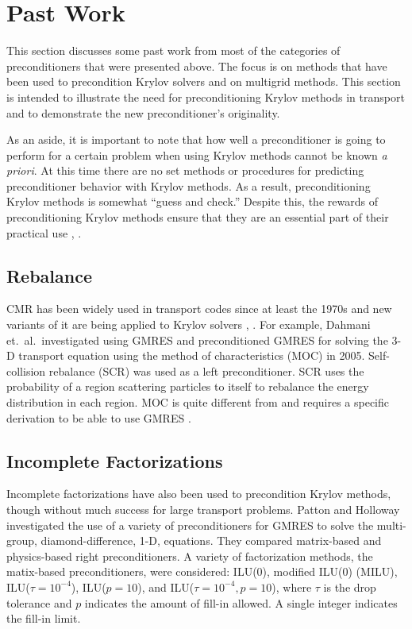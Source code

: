 \section{Past Work}
This section discusses some past work from most of the categories of preconditioners that were presented above. The focus is on methods that have been used to precondition Krylov solvers and on multigrid methods. This section is intended to illustrate the need for preconditioning Krylov methods in transport and to demonstrate the new preconditioner's originality. 

As an aside, it is important to note that how well a preconditioner is going to perform for a certain problem when using Krylov methods cannot be known \emph{a priori}. At this time there are no set methods or procedures for predicting preconditioner behavior with Krylov methods. As a result, preconditioning Krylov methods is somewhat ``guess and check.'' Despite this, the rewards of preconditioning Krylov methods ensure that they are an essential part of their practical use \cite{Knoll2004}, \cite{Benzi2002}. 

\subsection{Rebalance}
CMR has been widely used in transport codes since at least the 1970s and new variants of it are being applied to Krylov solvers \cite{Dahmani2002}, \cite{Yamamoto2005}. For example, Dahmani et.\ al.\ investigated using GMRES and preconditioned GMRES for solving the 3-D transport equation using the method of characteristics (MOC) in 2005. Self-collision rebalance (SCR) was used as a left preconditioner. SCR uses the probability of a region scattering particles to itself to rebalance the energy distribution in each region. MOC is quite different from \Sn and requires a specific derivation to be able to use GMRES \cite{Dahmani2002}. 

\subsection{Incomplete Factorizations}
Incomplete factorizations have also been used to precondition Krylov methods, though without much success for large transport problems. Patton and Holloway investigated the use of a variety of preconditioners for GMRES to solve the multi-group, diamond-difference, 1-D, \Sn equations. They compared matrix-based and physics-based right preconditioners. A variety of factorization methods, the matix-based preconditioners, were considered: ILU(0), modified ILU(0) (MILU), ILU($\tau=10^{-4}$), ILU($p=10$), and ILU($\tau=10^{-4}, p=10$), where $\tau$ is the drop tolerance and $p$ indicates the amount of fill-in allowed. A single integer indicates the fill-in limit. 

